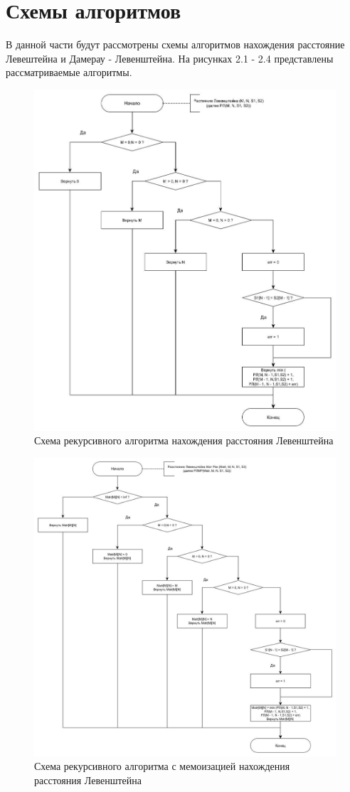 \documentclass[12pt]{report}
\begin{document}
\section{Схемы алгоритмов}
В данной части будут рассмотрены схемы алгоритмов нахождения расстояние Левештейна и Дамерау - Левенштейна. На рисунках 2.1 - 2.4 представлены рассматриваемые алгоритмы.
\clearpage
\begin{figure}[h]
	\centering
	\includegraphics[width=0.75\linewidth]{rec_lev.jpg}
	\caption{Схема рекурсивного алгоритма нахождения расстояния Левенштейна}
	\label{fig:mpr}
\end{figure}
\clearpage
\begin{figure}[h]
	\centering
	\includegraphics[scale=0.45]{rec_matr_lev.jpg}
	\caption{Схема рекурсивного алгоритма с мемоизацией нахождения расстояния Левенштейна}
	\label{fig:mpr}
\end{figure}
\end{document}
